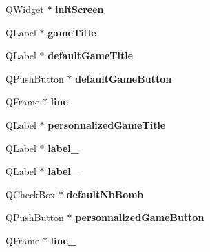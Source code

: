 \begin{DoxyCompactItemize}
Q\+Widget $\ast$ {\bfseries init\+Screen}
\item 
\mbox{\label{class_ui___g_u_i_screen_afdbf3e0c3ee19a9b10b2f03bc65fc63b}} 
Q\+Label $\ast$ {\bfseries game\+Title}
\item 
\mbox{\label{class_ui___g_u_i_screen_ae787caab477bd13bec24ad1c3f50562a}} 
Q\+Label $\ast$ {\bfseries default\+Game\+Title}
\item 
\mbox{\label{class_ui___g_u_i_screen_adbd8d94d269d0dccd1009198380f0a0d}} 
Q\+Push\+Button $\ast$ {\bfseries default\+Game\+Button}
\item 
\mbox{\label{class_ui___g_u_i_screen_a60c017496a306bae989fe856b82f92f2}} 
Q\+Frame $\ast$ {\bfseries line}
\item 
\mbox{\label{class_ui___g_u_i_screen_a26f89fe8fab356cdf86f95020eda1782}} 
Q\+Label $\ast$ {\bfseries personnalized\+Game\+Title}
\item 
\mbox{\label{class_ui___g_u_i_screen_a4a0176e792088d9a27ea0396e31b3f1f}} 
Q\+Label $\ast$ {\bfseries label\+\_}
\item 
\mbox{\label{class_ui___g_u_i_screen_a0575158e303a368dbda7957d7cb24105}} 
Q\+Label $\ast$ {\bfseries label\+\_}
\item 
\mbox{\label{class_ui___g_u_i_screen_a3f1ed9b32c050b2244d389306583c3e5}} 
Q\+Check\+Box $\ast$ {\bfseries default\+Nb\+Bomb}
\item 
\mbox{\label{class_ui___g_u_i_screen_a0ece335a6fa42b019ee3d82d30bb5d75}} 
Q\+Push\+Button $\ast$ {\bfseries personnalized\+Game\+Button}
\item 
\mbox{\label{class_ui___g_u_i_screen_a217005eb6e8b1cd7c00a8986ff732e05}} 
Q\+Frame $\ast$ {\bfseries line\+\_}
\item 
\mbox{\label{class_ui___g_u_i_screen_a6e8c669ced922fc71a0f9223d74cba40}} 

\end{DoxyCompactItemize}
